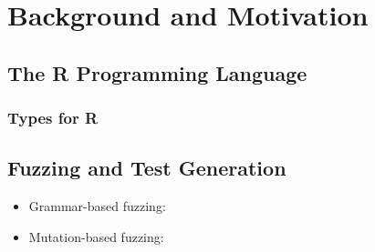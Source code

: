 \section{Background and Motivation}

\subsection{The R Programming Language}

\subsubsection{Types for R}

\subsection{Fuzzing and Test Generation}

\begin{itemize}
    \item Grammar-based fuzzing:
    \item Mutation-based fuzzing:
\end{itemize}
